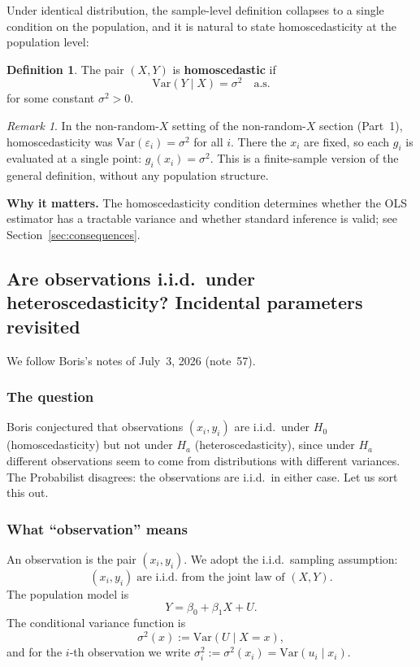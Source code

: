 \documentclass[a4paper,oneside,12pt]{extarticle}
\theoremstyle{plain}
\theoremstyle{definition}
\newtheorem{definition}[proposition]{Definition}
\theoremstyle{remark}
\newtheorem{remark}[proposition]{Remark}
\newcommand*{\Var}{\mathrm{Var}}
\newcommand*{\ve}{\varepsilon}
\begin{document}
Under identical distribution, the sample-level definition collapses to a
single condition on the population, and it is natural to state
homoscedasticity at the population level:

\begin{definition}
The pair $(X,Y)$ is \textbf{homoscedastic} if
\[
  \Var(Y \mid X) = \sigma^2 \quad \text{a.s.}
\]
for some constant $\sigma^2 > 0$.
\end{definition}

\begin{remark}
In the non-random-$X$ setting of the non-random-$X$ section (Part~1),
homoscedasticity was $\Var(\ve_i) = \sigma^2$ for all $i$. There the
$x_i$ are fixed, so each $g_i$ is evaluated at a single point: $g_i(x_i)
= \sigma^2$. This is a finite-sample version of the general definition,
without any population structure.
\end{remark}

\textbf{Why it matters.}
The homoscedasticity condition determines whether the OLS estimator
has a tractable variance and whether standard inference is valid;
see Section~\ref{sec:consequences}.


\subsection{Are observations i.i.d.\ under heteroscedasticity? Incidental parameters revisited}
\label{subsec:iid-heteroscedastic}

We follow Boris's notes of July~3, 2026 (note~57).

\subsubsection*{The question}

Boris conjectured that observations $(x_i, y_i)$ are i.i.d.\ under
$H_0$ (homoscedasticity) but not under $H_a$ (heteroscedasticity),
since under $H_a$ different observations seem to come from
distributions with different variances.  The Probabilist disagrees: the
observations are i.i.d.\ in either case.  Let us sort this out.

\subsubsection*{What ``observation'' means}

An observation is the pair $(x_i, y_i)$.  We adopt the i.i.d.\
sampling assumption:
\[
  (x_i, y_i) \;\text{are i.i.d.\ from the joint law of }(X, Y).
  \tag{0}
\]
The population model is
\[
  Y = \beta_0 + \beta_1 X + U. \tag{1}
\]
The conditional variance function is
\[
  \sigma^2(x) := \Var(U \mid X = x),
\]
and for the $i$-th observation we write $\sigma_i^2 := \sigma^2(x_i) =
\Var(u_i \mid x_i)$.
\end{document}
